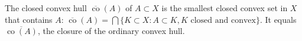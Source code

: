 The closed convex hull $\overline{\operatorname{co}}(A)$ of $A \subset X$ is the smallest closed convex set in $X$ that contains $A$: $\overline{\operatorname{co}}(A) = \bigcap\{K \subset X : A \subset K, K \text{ closed and convex}\}$. It equals $\overline{\operatorname{co}(A)}$, the closure of the ordinary convex hull.